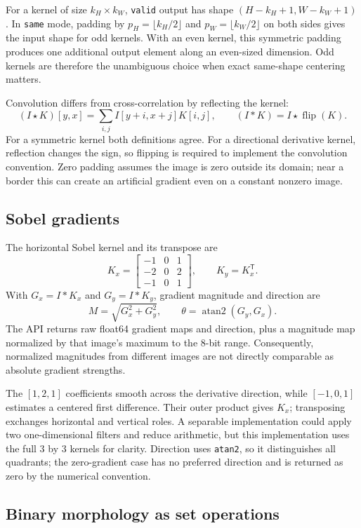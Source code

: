 \documentclass[11pt,a4paper]{article}
\newcommand{\1}{\mathbf{1}}
\begin{document}
For a kernel of size $k_H\times k_W$, \texttt{valid} output has shape
$(H-k_H+1,W-k_W+1)$. In \texttt{same} mode, padding by
$p_H=\lfloor k_H/2\rfloor$ and $p_W=\lfloor k_W/2\rfloor$ on both sides gives
the input shape for odd kernels. With an even kernel, this symmetric padding
produces one additional output element along an even-sized dimension. Odd
kernels are therefore the unambiguous choice when exact same-shape centering
matters.

Convolution differs from cross-correlation by reflecting the kernel:
\[
 (I\star K)[y,x]=\sum_{i,j}I[y+i,x+j]K[i,j],\qquad
 (I*K)=I\star\operatorname{flip}(K).
\]
For a symmetric kernel both definitions agree. For a directional derivative
kernel, reflection changes the sign, so flipping is required to implement the
convolution convention. Zero padding assumes the image is zero outside its
domain; near a border this can create an artificial gradient even on a
constant nonzero image.

\subsection{Sobel gradients}

The horizontal Sobel kernel and its transpose are
\[
K_x=\begin{bmatrix}-1&0&1\\-2&0&2\\-1&0&1\end{bmatrix},
\qquad K_y=K_x^{\mathsf T}.
\]
With $G_x=I*K_x$ and $G_y=I*K_y$, gradient magnitude and direction are
\[
  M=\sqrt{G_x^2+G_y^2},\qquad \theta=\operatorname{atan2}(G_y,G_x).
\]
The API returns raw float64 gradient maps and direction, plus a magnitude map
normalized by that image's maximum to the 8-bit range. Consequently, normalized
magnitudes from different images are not directly comparable as absolute
gradient strengths.

The $[1,2,1]$ coefficients smooth across the derivative direction, while
$[-1,0,1]$ estimates a centered first difference. Their outer product gives
$K_x$; transposing exchanges horizontal and vertical roles. A separable
implementation could apply two one-dimensional filters and reduce arithmetic,
but this implementation uses the full 3 by 3 kernels for clarity. Direction
uses \texttt{atan2}, so it distinguishes all quadrants; the zero-gradient case has no
preferred direction and is returned as zero by the numerical convention.

\subsection{Binary morphology as set operations}
\end{document}
